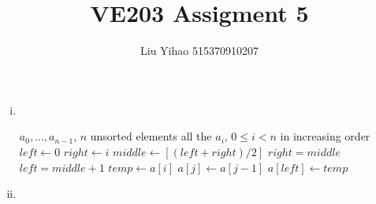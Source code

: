 \documentclass{article}
\title{VE203 Assigment 5}
\author{Liu Yihao 515370910207}
\date{}
\begin{document}
\maketitle

\section{}
\begin{enumerate}[i)]
\item \ 
\begin{algorithm}
\begin{algorithmic}[1]
	\Require $a_0,...,a_{n-1}$, $n$ unsorted elements
	\Ensure all the $a_i$, $0\leqslant i<n$ in increasing order
    	\State $left \gets 0$
    	\State $right \gets i$
    		\State $middle \gets [(left + right)/2]$
    			\State $right = middle$
			\Else    		
    			\State $left = middle + 1$
    		\EndIf
    	\EndWhile
    	\State $temp \gets a[i]$
    		\State $a[j] \gets a[j - 1]$
    	\EndFor
    	\State $a[left] \gets temp$
    \EndFor
\end{algorithmic}
\end{algorithm}
\item

\end{enumerate}
\end{document}
